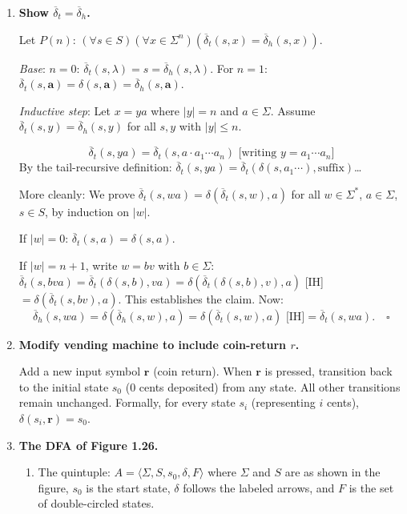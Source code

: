 \documentclass[11pt]{book}
\def\DBAR{\ensuremath{\overline{\delta}}}
\begin{document}
\begin{enumerate}[{1.}1.]

\item \textbf{Show $\DBAR_t = \DBAR_h$.}

Let $P(n)$: $(\forall s\in S)(\forall x\in\Sigma^n)(\DBAR_t(s,x)=\DBAR_h(s,x))$.

\textit{Base}: $n=0$: $\DBAR_t(s,\lambda)=s=\DBAR_h(s,\lambda)$. For $n=1$: $\DBAR_t(s,\mathbf{a})=\delta(s,\mathbf{a})=\DBAR_h(s,\mathbf{a})$.

\textit{Inductive step}: Let $x=ya$ where $|y|=n$ and $a\in\Sigma$. Assume $\DBAR_t(s,y)=\DBAR_h(s,y)$ for all $s,y$ with $|y|\leq n$.

\[
\DBAR_t(s,ya) = \DBAR_t(s,a\cdot a_1\cdots a_n) \text{ [writing $y=a_1\cdots a_n$]}
\]
By the tail-recursive definition: $\DBAR_t(s,ya) = \DBAR_t(\delta(s,a_1\cdots),\text{suffix})$\ldots

More cleanly: We prove $\DBAR_t(s,wa)=\delta(\DBAR_t(s,w),a)$ for all $w\in\Sigma^*$, $a\in\Sigma$, $s\in S$, by induction on $|w|$.

If $|w|=0$: $\DBAR_t(s,a) = \delta(s,a)$. \checkmark

If $|w|=n+1$, write $w=bv$ with $b\in\Sigma$: $\DBAR_t(s,bva) = \DBAR_t(\delta(s,b),va) = \delta(\DBAR_t(\delta(s,b),v),a)$ [IH] $= \delta(\DBAR_t(s,bv),a)$. This establishes the claim. Now:
\[
\DBAR_h(s,wa) = \delta(\DBAR_h(s,w),a) = \delta(\DBAR_t(s,w),a) \text{ [IH]} = \DBAR_t(s,wa). \quad\square
\]

\item \textbf{Modify vending machine to include coin-return $r$.}

Add a new input symbol $\mathbf{r}$ (coin return). When $\mathbf{r}$ is pressed, transition back to the initial state $s_0$ (0 cents deposited) from any state. All other transitions remain unchanged. Formally, for every state $s_i$ (representing $i$ cents), $\delta(s_i, \mathbf{r}) = s_0$.

\item \textbf{The DFA of Figure 1.26.}

\begin{enumerate}
\item The quintuple: $A = \langle\Sigma, S, s_0, \delta, F\rangle$ where $\Sigma$ and $S$ are as shown in the figure, $s_0$ is the start state, $\delta$ follows the labeled arrows, and $F$ is the set of double-circled states.


\end{enumerate}
\end{enumerate}
\end{document}
